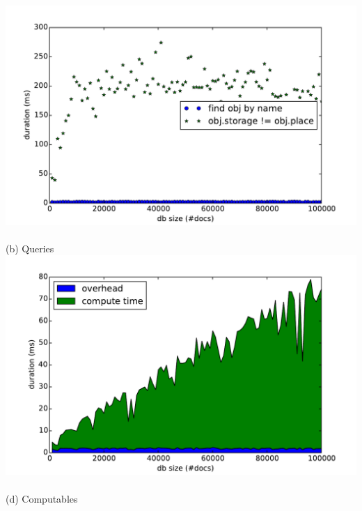 \begin{frame}
\begin{columns}
    \begin{column}{0.55\textwidth}
  \centering
    \small
    \\\vspace{-0.15cm}
    \includegraphics[width=\textwidth]{../thesis/plots/query-durations-index}\\
    \\\vspace{-0.05cm}
    (b) Queries
    \\\vspace{-0.1cm}
    \includegraphics[width=\textwidth]{../thesis/plots/computable-durations-index}\\
    \\\vspace{-0.05cm}
    (d) Computables
    \end{column}
  \end{columns}
\end{frame}



